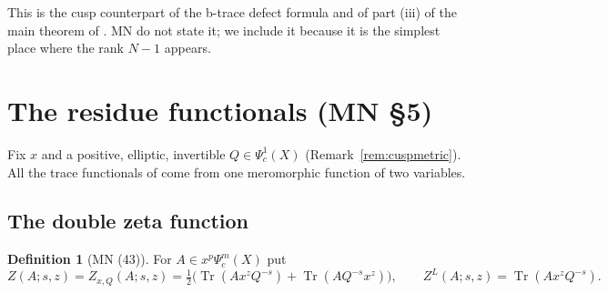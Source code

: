 \documentclass[11pt,oneside,reqno]{article}
\DeclareMathOperator{\Tr}{Tr}
\newcommand{\Psic}{\Psi_{c}}
\theoremstyle{plain}
\theoremstyle{definition}
\newtheorem{definition}[theorem]{Definition}
\theoremstyle{remark}
\begin{document}
This is the cusp counterpart of the b-trace defect formula and of part
(iii) of the main theorem of \cite{HHb}. MN do not state it; we include it
because it is the simplest place where the rank \(N-1\) appears.

\section{The residue functionals (MN \S5)}\label{sec:residues}

Fix \(x\) and a positive, elliptic, invertible \(Q\in\Psic^1(X)\)
(Remark~\ref{rem:cuspmetric}). All the trace functionals of \cite{MN} come
from one meromorphic function of two variables.

\subsection{The double zeta function}

\begin{definition}[MN (43)]
For \(A\in x^p\Psic^m(X)\) put
\[
 Z(A;s,z)=Z_{x,Q}(A;s,z)=\tfrac12\bigl(\Tr(Ax^zQ^{-s})+\Tr(AQ^{-s}x^z)\bigr),
 \qquad Z^L(A;s,z)=\Tr(Ax^zQ^{-s}).
\]
\end{definition}
\end{document}
